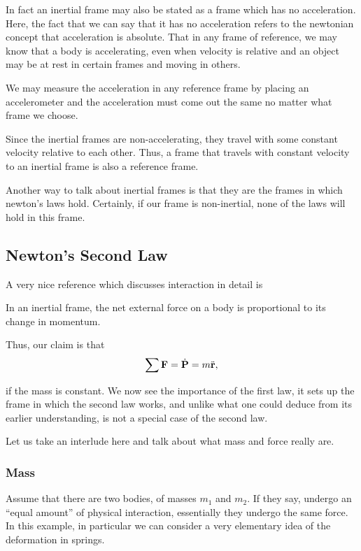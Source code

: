 In fact an inertial frame may also be stated as a frame which has no acceleration.
Here, the fact that we can say that it has no acceleration refers
to the newtonian concept that acceleration is absolute. That in any frame 
of reference, we may know that a body is accelerating, even when velocity is 
relative and an object may be at rest in certain frames and moving in others.

We may measure the acceleration in any reference frame by placing 
an accelerometer and the acceleration must come out the same no matter
what frame we choose.

Since the inertial frames are non-accelerating, they travel with some constant velocity 
relative to each other. Thus, a frame that travels with constant velocity 
to an inertial frame is also a reference frame.

Another way to talk about inertial frames is that they are the frames in which newton's laws
hold. Certainly, if our frame is non-inertial, none of the laws will hold in this frame.

\subsection{Newton's Second Law}
\label{sec: newton's second law}
A very nice reference which discusses interaction in detail is \cite{kleppner}

\begin{axioms}
     In an inertial frame, the net external force on a body is proportional to its change in 
    momentum.
\end{axioms}

Thus, our claim is that
\[\sum \mathbf{F} = \dot{\boldsymbol{\mathbf{P}}} = m\ddot{\boldsymbol{\mathbf{r}}},\]

if the mass is constant. We now see the importance of the first law, it sets up the 
frame in which the second law works, and unlike what one could 
deduce from its earlier understanding, is not 
a special case of the second law.

Let us take an interlude here and talk about what mass and force really are.

\subsubsection{Mass}

Assume that there are two bodies, of masses \(m_1\) and \(m_2\).
If they say, undergo an ``equal amount'' of physical interaction,
essentially they undergo the same force. In this example, in particular 
we can consider a very elementary idea of the deformation in springs.

